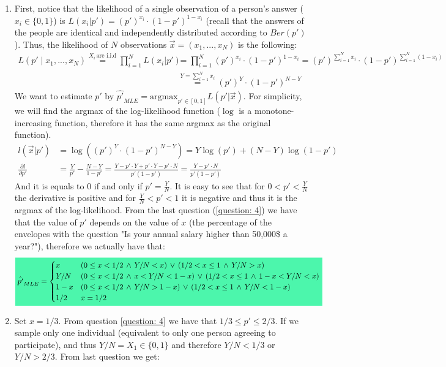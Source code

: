 \documentclass[../main.tex]{subfiles}
\begin{document}
\begin{enumerate}
    \item \label{question: 5}First, notice that the likelihood of a single observation of a person's answer ($x_i\in \{0, 1\}$) is $L(x_i|p')=(p')^{x_i}\cdot(1-p')^{1-x_i}$ (recall that the answers of the people are identical and independently distributed according to $Ber(p')$). Thus, the likelihood of $N$ observations $\Vec{x}=(x_1,..., x_N)$ is the following:
    \begin{align*}L(p'\mid x_1,...,x_N)\overset{X_i\, \text{are i.i.d}}{=}\prod\limits_{i=1}^{N}L(x_i|p')&=\prod\limits_{i=1}^{N}(p')^{x_i}\cdot(1-p')^{1-x_i}=(p')^{\sum_{i=1}^N x_i}\cdot(1-p')^{\sum_{i=1}^N (1-x_i)}\\ &\overset{Y=\sum_{i=1}^N x_i}{=}(p')^{Y}\cdot(1-p')^{N-Y}\end{align*}
    We want to estimate $p'$ by $\hat{p'}_{MLE}=\text{argmax}_{p'\in[0, 1]}L(p'|\Vec{x})$. For simplicity, we will find the argmax of the log-likelihood function ($\log$ is a monotone-increasing function, therefore it has the same argmax as the original function).
    \begin{align*}l(\Vec{x}|p')&=\log\left((p')^{Y}\cdot(1-p')^{N-Y}\right)=Y\log(p')+(N-Y)\log(1-p')\\
    \frac{\partial l}{\partial p'}&= \frac{Y}{p'}-\frac{N-Y}{1-p'}=\frac{Y-p'\cdot Y+p'\cdot Y-p'\cdot N}{p'(1-p')}=\frac{Y-p'\cdot N}{p'(1-p')}\end{align*}
    And it is equals to 0 if and only if $p' = \frac{Y}{N}$. It is easy to see that for $0<p'<\frac{Y}{N}$ the derivative is positive and for $\frac{Y}{N}<p'<1$ it is negative and thus it is the argmax of the log-likelihood. From the last question (\ref{question: 4}) we have that the value of $p'$ depends on the value of $x$ (the percentage of the envelopes with the question "Is your annual salary higher than 50,000\$ a year?"), therefore we actually have that:
    \[\mathcolorbox{goodcolor}{\hat{p'}_{MLE}=\begin{cases}
    x & \left(0\le x<1/2\, \land\, Y/N<x\right)\,\vee\,\left(1/2<x\le1\,\land \,Y/N>x\right) \\
    Y/N & \left(0\le x<1/2 \,\land\, x<Y/N<1-x\right)\,\vee\,\left(1/2<x\le1\,\land\, 1-x<Y/N<x\right)\\
    1-x & \left(0\le x<1/2\, \land\, Y/N>1-x\right)\,\vee\,\left(1/2<x\le1\,\land\, Y/N<1-x\right)\\
    1/2 & x=1/2
    \end{cases}}\]
    \item Set $x=1/3$. From question \ref{question: 4} we have that $1/3\le p'\le2/3$. If we sample only one individual (equivalent to only one person agreeing to participate), and thus $Y/N=X_1\in \{0, 1\}$ and therefore $Y/N<1/3$ or $Y/N>2/3$. From last question we get:

\end{enumerate}
\end{document}
